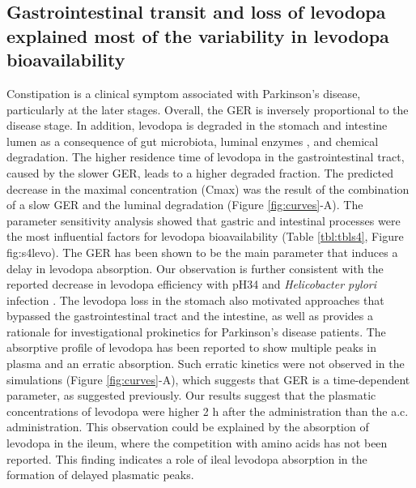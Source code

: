 \subsection{Gastrointestinal transit and loss of levodopa explained most of the variability in levodopa bioavailability}
Constipation is a clinical symptom associated with Parkinson's disease, particularly at the later stages\cite{fasano2015gastrointestinal}. Overall, the GER is inversely proportional to the disease stage\cite{doi2012plasma}. In addition, levodopa is degraded in the stomach and intestine lumen as a consequence of gut microbiota\cite{sousa2008gastrointestinal}, luminal enzymes \cite{nutt1984off}, and chemical degradation\cite{agoram2001predicting}.
The higher residence time of levodopa in the gastrointestinal tract, caused by the slower GER, leads to a higher degraded fraction. The predicted decrease in the maximal concentration (Cmax) was the result of the combination of a slow GER and the luminal degradation (Figure \ref{fig:curves}-A). The parameter sensitivity analysis showed that gastric and intestinal processes were the most influential factors for levodopa bioavailability (Table \ref{tbl:tbls4}, Figure {fig:s4levo}). The GER has been shown to be the main parameter that induces a delay in levodopa
absorption\cite{doi2012plasma}. Our observation is further consistent with the reported decrease in levodopa efficiency with pH34 and \textit{Helicobacter pylori} infection \cite{hashim2014eradication} \cite{pierantozzi2006helicobacter}. The levodopa loss in the stomach also motivated approaches that bypassed the gastrointestinal tract \cite{foltynie2013impact} and the intestine\cite{nutt1984off}, as well as provides a rationale for investigational prokinetics for Parkinson's disease patients\cite{sanger2009gsk962040}.
The absorptive profile of levodopa has been reported to show multiple peaks in plasma and an erratic absorption. Such erratic kinetics were not observed in the simulations (Figure \ref{fig:curves}-A), which suggests that GER is a time-dependent parameter, as suggested previously\cite{waller1991oral}. Our results suggest that the plasmatic concentrations of levodopa were higher 2 h after the administration than the a.c. administration. This observation could be explained by the absorption of levodopa in the ileum, where the competition with amino acids has not been reported\cite{adibi1967kinetics}. This finding indicates a role of ileal levodopa absorption in the formation of delayed plasmatic peaks.

